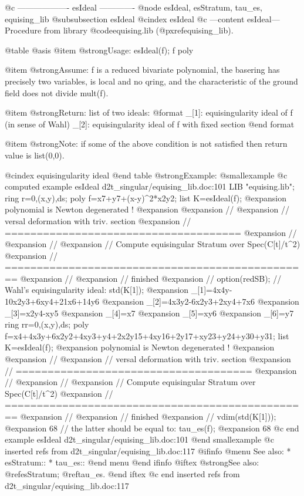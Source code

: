@c ------------------- esIdeal -------------
@node esIdeal, esStratum, tau_es, equising_lib
@subsubsection esIdeal
@cindex esIdeal
@c ---content esIdeal---
Procedure from library @code{equising.lib} (@pxref{equising_lib}).

@table @asis
@item @strong{Usage:}
esIdeal(f); f poly

@item @strong{Assume:}
f is a reduced bivariate polynomial, the basering has precisely
two variables, is local and no qring, and the characteristic of
the ground field does not divide mult(f).

@item @strong{Return:}
list of two ideals:
@format
          _[1]:  equisingularity ideal of f (in sense of Wahl)
          _[2]:  equisingularity ideal of f with fixed section
@end format

@item @strong{Note:}
if some of the above condition is not satisfied then return
value is list(0,0).

@cindex equisingularity ideal
@end table
@strong{Example:}
@smallexample
@c computed example esIdeal d2t_singular/equising_lib.doc:101 
LIB "equising.lib";
ring r=0,(x,y),ds;
poly f=x7+y7+(x-y)^2*x2y2; 
list K=esIdeal(f);
@expansion{} polynomial is Newton degenerated !
@expansion{} 
@expansion{} // 
@expansion{} // versal deformation with triv. section
@expansion{} // =====================================
@expansion{} // 
@expansion{} // 
@expansion{} // Compute equisingular Stratum over Spec(C[t]/t^2)
@expansion{} // ================================================
@expansion{} // 
@expansion{} // finished
@expansion{} // 
option(redSB);
// Wahl's equisingularity ideal:
std(K[1]);
@expansion{} _[1]=4x4y-10x2y3+6xy4+21x6+14y6
@expansion{} _[2]=4x3y2-6x2y3+2xy4+7x6
@expansion{} _[3]=x2y4-xy5
@expansion{} _[4]=x7
@expansion{} _[5]=xy6
@expansion{} _[6]=y7
ring rr=0,(x,y),ds;
poly f=x4+4x3y+6x2y2+4xy3+y4+2x2y15+4xy16+2y17+xy23+y24+y30+y31;
list K=esIdeal(f);
@expansion{} polynomial is Newton degenerated !
@expansion{} 
@expansion{} // 
@expansion{} // versal deformation with triv. section
@expansion{} // =====================================
@expansion{} // 
@expansion{} // 
@expansion{} // Compute equisingular Stratum over Spec(C[t]/t^2)
@expansion{} // ================================================
@expansion{} // 
@expansion{} // finished
@expansion{} // 
vdim(std(K[1]));
@expansion{} 68
// the latter should be equal to: 
tau_es(f);
@expansion{} 68
@c end example esIdeal d2t_singular/equising_lib.doc:101
@end smallexample
@c inserted refs from d2t_singular/equising_lib.doc:117
@ifinfo
@menu
See also:
* esStratum::
* tau_es::
@end menu
@end ifinfo
@iftex
@strong{See also:}
@ref{esStratum};
@ref{tau_es}.
@end iftex
@c end inserted refs from d2t_singular/equising_lib.doc:117

